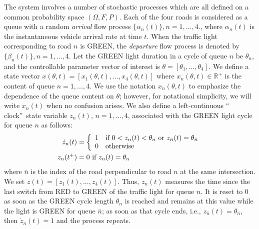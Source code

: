 \documentclass{ifacconf}\usepackage{graphicx}
\begin{document}
The system involves a number of stochastic processes which are all defined on
a common probability space $(\Omega,F,P)$. Each of the four roads is
considered as a queue with a random \emph{arrival} flow process $\{\alpha
_{n}(t)\},n=1,\ldots,4.$, where $\alpha_{n}(t)$ is the instantaneous vehicle
arrival rate at time $t$. When the traffic light corresponding to road $n$ is
GREEN, the \emph{departure} flow process is denoted by $\{\beta_{n}(t)\},n=1,\ldots,4.$ Let the GREEN light duration in a cycle of queue $n$ be
$\theta_{n}$, and the controllable parameter vector of interest is
$\theta=[\theta_{1},\ldots,\theta_{4}]$. We define a state vector
$x(\theta,t)=[x_{1}(\theta,t),...,x_{4}(\theta,t)]$ where $x_{n}(\theta
,t)\in\mathbb{R}^{+}$ is the content of queue $n=1,...,4$. We use the notation
$x_{n}(\theta,t)$ to emphasize the dependence of the queue content on $\theta
$; however, for notational simplicity, we will write $x_{n}(t)$ when no
confusion arises. We also define a left-continuous \textquotedblleft
clock\textquotedblright\ state variable $z_{n}(t)$, $n=1,...,4$, associated
with the GREEN light cycle for queue $n$ as follows:
\begin{align}
\dot{z}_{n}(t) &  =\left\{
\begin{array}
[c]{ll}1 & \text{if }0<z_{n}(t)<\theta_{n}\text{ or }z_{\bar{n}}(t)=\theta_{\bar{n}}\\
0 & \text{otherwise}\end{array}
\right.  \label{dzdt}\\
z_{n}(t^{+}) &  =0\text{ if }z_{n}(t)=\theta_{n}\nonumber
\end{align}
where $\bar{n}$ is the index of the road perpendicular to road $n$ at the same
intersection. We set $z(t)=[z_{1}(t),...,z_{4}(t)]$. Thus, $z_{n}(t)$ measures
the time since the last switch from RED to GREEN of the traffic light for
queue $n$. It is reset to $0$ as soon as the GREEN cycle length $\theta_{n}$
is reached and remains at this value while the light is GREEN for queue
$\bar{n}$; as soon as that cycle ends, i.e., $z_{\bar{n}}(t)=\theta_{\bar{n}}$, then $\dot{z}_{n}(t)=1$ and the process repeats.
\end{document}

